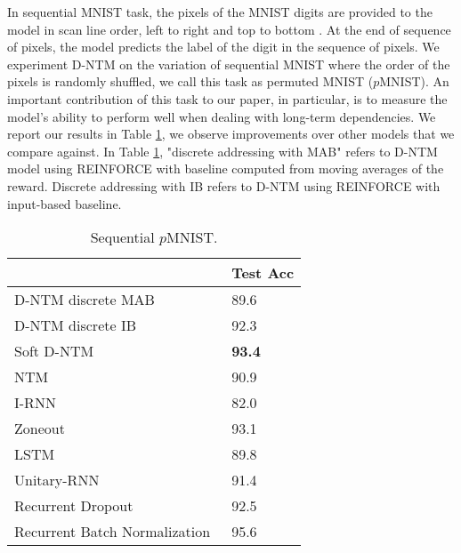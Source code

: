 \documentclass[12pt]{article}
\begin{document}
In sequential MNIST task, the pixels of the MNIST digits are provided to the model in scan line order, left to right and top to bottom \citep{le2015simple}. At the end of sequence of pixels, the model predicts the label of the digit in the sequence of pixels. We experiment D-NTM on the variation of sequential MNIST where the order of the pixels is randomly shuffled, we call this task as permuted MNIST ($p$MNIST). An important contribution of this task to our paper, in particular, is to measure the model's ability to perform well when dealing with long-term dependencies. We report our results in Table \ref{tbl:pmnist_dntm_comp}, we observe improvements over other models that we compare against. In Table \ref{tbl:pmnist_dntm_comp}, "discrete addressing with MAB" refers to D-NTM model using REINFORCE with baseline computed from moving averages of the reward. Discrete addressing with IB refers to D-NTM using REINFORCE with input-based baseline.

\begin{table}[htbp]
\centering
\footnotesize
\begin{tabular}{@{}ll@{}}
\toprule
                                                    & Test  Acc \\ \midrule
D-NTM discrete MAB     & 89.6   \\
D-NTM discrete  IB      &  92.3  \\ Soft D-NTM                          & \textbf{93.4}           \\
NTM                                               & 90.9          \\\midrule
I-RNN~\citep{le2015simple}                                & 82.0           \\
Zoneout~\citep{krueger2016zoneout}                                             & 93.1           \\
LSTM~\citep{krueger2016zoneout}                                               & 89.8           \\
Unitary-RNN~\citep{arjovsky2015unitary}                  & 91.4           \\
Recurrent Dropout~\citep{krueger2016zoneout}                                   & 92.5           \\ 
Recurrent Batch Normalization~\citep{cooijmans2016recurrent}    & 95.6 \\ \bottomrule
\end{tabular}
\caption{ Sequential $p$MNIST.}
\label{tbl:pmnist_dntm_comp}

\end{table}
\end{document}
